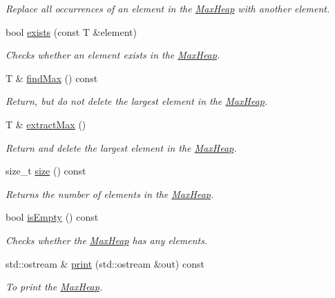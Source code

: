 \begin{DoxyCompactItemize}
\begin{DoxyCompactList}\small\item\em Replace all occurrences of an element in the \hyperlink{class_max_heap}{Max\+Heap} with another element. \end{DoxyCompactList}\item 
bool \hyperlink{class_max_heap_af8f92dc7cd91a6c65825ee23150ba143}{exists} (const T \&element)
\begin{DoxyCompactList}\small\item\em Checks whether an element exists in the \hyperlink{class_max_heap}{Max\+Heap}. \end{DoxyCompactList}\item 
T \& \hyperlink{class_max_heap_a03c0806bbc4c9c166c065a7c280457c4}{find\+Max} () const
\begin{DoxyCompactList}\small\item\em Return, but do not delete the largest element in the \hyperlink{class_max_heap}{Max\+Heap}. \end{DoxyCompactList}\item 
T \& \hyperlink{class_max_heap_a31f3fe175dce628b83f79c31805feb59}{extract\+Max} ()
\begin{DoxyCompactList}\small\item\em Return and delete the largest element in the \hyperlink{class_max_heap}{Max\+Heap}. \end{DoxyCompactList}\item 
size\+\_\+t \hyperlink{class_max_heap_a1894c47131530a277c2f778659520fa4}{size} () const
\begin{DoxyCompactList}\small\item\em Returns the number of elements in the \hyperlink{class_max_heap}{Max\+Heap}. \end{DoxyCompactList}\item 
bool \hyperlink{class_max_heap_aff04964e9ead102a8b98eaa00836351c}{is\+Empty} () const
\begin{DoxyCompactList}\small\item\em Checks whether the \hyperlink{class_max_heap}{Max\+Heap} has any elements. \end{DoxyCompactList}\item 
\mbox{\label{class_max_heap_ab08ef20423c039f010516091c2d361e6}} 
std\+::ostream \& \hyperlink{class_max_heap_ab08ef20423c039f010516091c2d361e6}{print} (std\+::ostream \&out) const
\begin{DoxyCompactList}\small\item\em To print the \hyperlink{class_max_heap}{Max\+Heap}. \end{DoxyCompactList}\end{DoxyCompactItemize}
